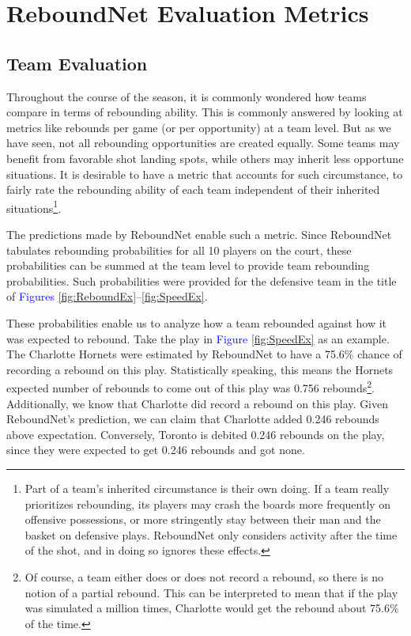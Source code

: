 \documentclass{article}
\begin{document}
\clearpage

\section{ReboundNet Evaluation Metrics}

\subsection{Team Evaluation}
\noindent
Throughout the course of the season, it is commonly wondered how teams compare in terms of rebounding ability. This is commonly answered by looking at metrics like rebounds per game (or per opportunity) at a team level. But as we have seen, not all rebounding opportunities are created equally. Some teams may benefit from favorable shot landing spots, while others may inherit less opportune situations. It is desirable to have a metric that accounts for such circumstance, to fairly rate the rebounding ability of each team independent of their inherited situations\footnote{Part of a team's inherited circumstance is their own doing. If a team really prioritizes rebounding, its players may crash the boards more frequently on offensive possessions, or more stringently stay between their man and the basket on defensive plays. ReboundNet only considers activity after the time of the shot, and in doing so ignores these effects.}.

\bigbreak
\noindent
The predictions made by ReboundNet enable such a metric. Since ReboundNet tabulates rebounding probabilities for all 10 players on the court, these probabilities can be summed at the team level to provide team rebounding probabilities. Such probabilities were provided for the defensive team in the title of \textcolor{blue}{Figures} \ref{fig:ReboundEx}\textcolor{blue}{--}\ref{fig:SpeedEx}. 

\bigbreak
\noindent
These probabilities enable us to analyze how a team rebounded against how it was expected to rebound. Take the play in 
 \textcolor{blue}{Figure} \ref{fig:SpeedEx} as an example. The Charlotte Hornets were estimated by ReboundNet to have a 75.6\% chance of recording a rebound on this play. Statistically speaking, this means the Hornets expected number of rebounds to come out of this play was 0.756 rebounds\footnote{Of course, a team either does or does not record a rebound, so there is no notion of a partial rebound. This can be interpreted to mean that if the play was simulated a million times, Charlotte would get the rebound about 75.6\% of the time.}. Additionally, we know that Charlotte did record a rebound on this play. Given ReboundNet's prediction, we can claim that Charlotte added 0.246 rebounds above expectation. Conversely, Toronto is debited 0.246 rebounds on the play, since they were expected to get 0.246 rebounds and got none.
 
\end{document}
